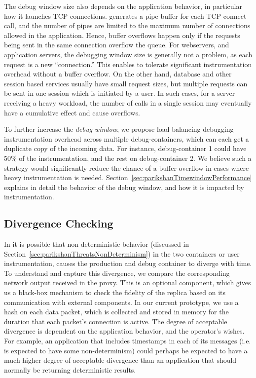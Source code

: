 The debug window size also depends on the application behavior, in particular how it launches TCP connections. 
\parikshan generates a pipe buffer for each TCP connect call, and the number of pipes are limited to the maximum number of connections allowed in the application.
Hence, buffer overflows happen only if the requests being sent in the same connection overflow the queue.
For webservers, and application servers, the debugging window size is generally not a problem, as each request is a new ``connection.''
This enables \parikshan to tolerate significant instrumentation overhead without a buffer overflow.
On the other hand, database and other session based services usually have small request sizes, but multiple requests can be sent in one session which is initiated by a user. 
In such cases, for a server receiving a heavy workload, the number of calls in a single session may eventually have a cumulative effect and cause overflows.

To further increase the \emph{debug window}, we propose load balancing debugging instrumentation overhead across multiple debug-containers, which can each get a duplicate copy of the incoming data. 
For instance, debug-container 1 could have 50\% of the instrumentation, and the rest on debug-container 2.
We believe such a strategy would significantly reduce the chance of a buffer overflow in cases where heavy instrumentation is needed.
Section~\ref{sec:parikshanTimewindowPerformance} explains in detail the behavior of the debug window, and how it is impacted by instrumentation.


\subsection{Divergence Checking}
\label{sec:parikshanDivergenceChecking}

In \parikshan it is possible that non-deterministic behavior (discussed in Section~\ref{sec:parikshanThreatsNonDeterminism}) in the two containers or user instrumentation, causes the production and debug container to diverge with time.
To understand and capture this divergence, we compare the corresponding network output received in the proxy.
This is an optional component, which gives us a black-box mechanism to check the fidelity of the replica based on its communication with external components.
In our current prototype, we use a hash on each data packet, which is collected and stored in memory for the duration that each packet's connection is active.
The degree of acceptable divergence is dependent on the application behavior, and the operator's wishes. 
For example, an application that includes timestamps in each of its messages (i.e. is expected to have some non-determinism) could perhaps be expected to have a much higher degree of acceptable divergence than an application that should normally be returning deterministic results.



